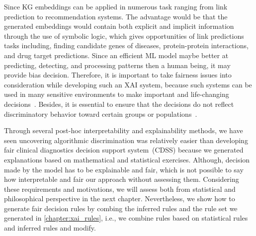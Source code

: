 \hspace*{3.5mm}Since KG embeddings can be applied in numerous task ranging from link prediction to recommendation systems. The advantage would be that the generated embeddings would contain both explicit and implicit information through the use of symbolic logic, which gives opportunities of link predictions tasks including, finding candidate genes of diseases, protein-protein interactions, and drug target predictions. Since an efficient ML model maybe better at predicting, detecting, and processing patterns then a human being, it may provide bias decision. Therefore, it is important to take fairness issues into consideration while developing such an XAI system, because such systems can be used in many sensitive environments to make important and life-changing decisions~\cite{stiglic2020interpretability}. Besides, it is essential to ensure that the decisions do not reflect discriminatory behavior toward certain groups or populations~\cite{mehrabi2019survey}. 

\hspace*{3.5mm} Through several post-hoc interpretability and explainability methods, we have seen uncovering algorithmic discrimination was relatively easier than developing fair clinical diagnostics decision support system~(CDSS) because we generated explanations based on mathematical and statistical exercises. Although, decision made by the model has to be explainable and fair, which is not possible to say how interpretable and fair our approach without assessing them. Considering these requirements and motivations, we will assess both from statistical and philosophical perspective in the next chapter. Nevertheless, we show how to generate fair decision rules by combing the inferred rules and the rule set we generated in \cref{chapter:xai_rules}, i.e., we combine rules based on statistical rules and inferred rules and modify.%

	\vspace{-2mm}

